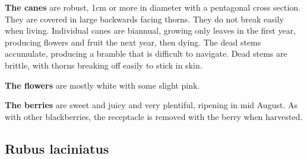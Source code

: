 \textbf{The canes} are robust, 1cm or more in diameter with a pentagonal cross section. They are covered in large backwards facing thorns. They do not break easily when living. Individual canes are biannual, growing only leaves in the first year, producing flowers and fruit the next year, then dying. The dead stems accumulate, producing a bramble that is difficult to navigate. Dead stems are brittle, with thorns breaking off easily to stick in skin.

\textbf{The flowers} are mostly white with some slight pink. 

\textbf{The berries} are sweet and juicy and very plentiful, ripening in mid August. As with other blackberries, the receptacle is removed with the berry when harvested.



\subsection{Rubus laciniatus}

